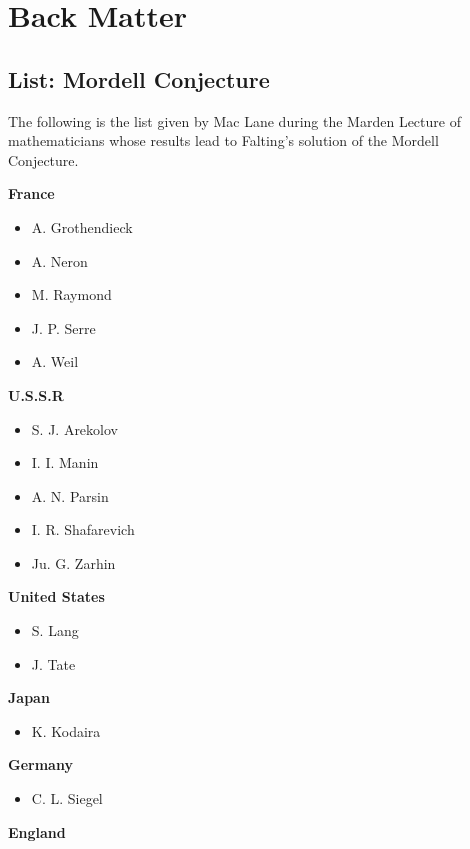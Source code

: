 \section*{Back Matter}



\subsection*{List: Mordell Conjecture}

The following is the list given by Mac Lane during the Marden Lecture of mathematicians whose results lead to Falting's solution of the Mordell Conjecture. \\

\begin{description}
\item \textbf{France}
\begin{itemize}\itemsep1pt
\item A. Grothendieck
\item A. Neron
\item M. Raymond
\item J. P. Serre
\item A. Weil
\end{itemize}
\item \textbf{U.S.S.R}
\begin{itemize}\itemsep1pt
\item S. J. Arekolov
\item I. I. Manin
\item A. N. Parsin
\item I. R. Shafarevich
\item Ju. G. Zarhin
\end{itemize}
\item \textbf{United States}
\begin{itemize}\itemsep1pt
\item S. Lang
\item J. Tate
\end{itemize}
\item \textbf{Japan}
\begin{itemize}\itemsep1pt
\item K. Kodaira
\end{itemize}
\item \textbf{Germany}
\begin{itemize}\itemsep1pt
\item C. L. Siegel
\end{itemize}
\item \textbf{England}

\end{description}
